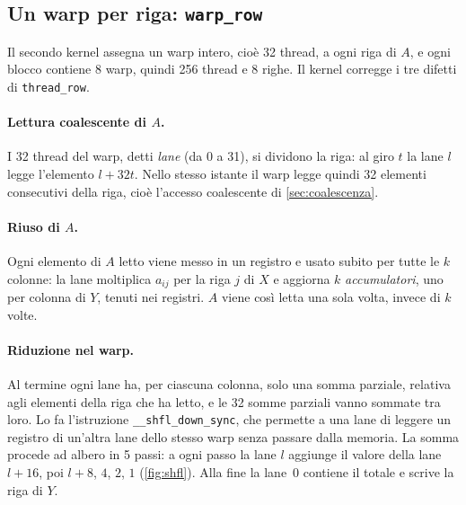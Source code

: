 \documentclass[11pt,a4paper]{article}
\begin{document}
\subsection{Un warp per riga: \texttt{warp\_row}}\label{sec:warp-row}

Il secondo kernel assegna un warp intero, cioè 32 thread, a ogni riga di $A$, e ogni blocco contiene 8 warp, quindi 256 thread e 8 righe. Il kernel corregge i
tre difetti di \texttt{thread\_row}.

\paragraph{Lettura coalescente di $A$.} I 32 thread del warp, detti
\emph{lane} (da 0 a 31), si dividono la riga: al giro $t$ la lane $l$ legge
l'elemento $l + 32t$. Nello stesso istante il warp legge quindi 32 elementi
consecutivi della riga, cioè l'accesso coalescente di \cref{sec:coalescenza}.

\paragraph{Riuso di $A$.} Ogni elemento di $A$ letto viene messo in un
registro e usato subito per tutte le $k$ colonne: la lane moltiplica $a_{ij}$
per la riga $j$ di $X$ e aggiorna $k$ \emph{accumulatori}, uno per colonna di
$Y$, tenuti nei registri. $A$ viene così letta una sola volta, invece di $k$
volte.

\paragraph{Riduzione nel warp.} Al termine ogni lane ha, per ciascuna colonna,
solo una somma parziale, relativa agli elementi della riga che ha letto, e le
32 somme parziali vanno sommate tra loro. Lo fa l'istruzione
\texttt{\_\_shfl\_down\_sync}, che permette a una lane di leggere un registro
di un'altra lane dello stesso warp senza passare dalla memoria. La somma
procede ad albero in 5 passi: a ogni passo la lane $l$ aggiunge il valore della
lane $l + 16$, poi $l + 8$, $4$, $2$, $1$ (\cref{fig:shfl}). Alla fine la lane~0
contiene il totale e scrive la riga di $Y$.
\end{document}

